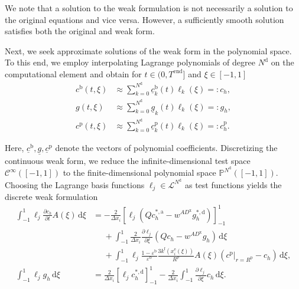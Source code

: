 We note that a solution to the weak formulation is not necessarily a solution to the original equations and vice versa. However, a sufficiently smooth solution satisfies both the original and weak form.

Next, we seek approximate solutions of the weak form in the polynomial space. To this end, we employ interpolating Lagrange polynomials of degree $N^\mathrm{d}$ on the computational element and obtain for $t\in(0,T^\mathrm{end}]$ and $\xi\in[-1,1]$
\begin{subequations}
\begin{align}
    c^\mathrm{b}(t,\xi)
    &\approx
    \sum_{k=0}^{N^\mathrm d}
    \underline{c}^\mathrm b_k(t)
    \ell_k(\xi)
    =:c_h,
    \\
    g(t,\xi)
    &\approx
    \sum_{k=0}^{N^\mathrm d}
    \underline{g}_k(t)
    \ell_k(\xi)
    =:g_h,
    \\
    c^\mathrm p(t,\xi)
    &\approx
    \sum_{k=0}^{N^\mathrm d}
    \underline{c}^\mathrm p_k(t)
    \ell_k(\xi)
    =:c_h^\mathrm p.
\end{align}
\end{subequations}

Here, $\underline{c}^\mathrm{b},\underline{g},\underline{c}^\mathrm{p}$ denote the vectors of polynomial coefficients.
Discretizing the continuous weak form, we reduce the infinite-dimensional test space $\mathcal C^\infty([-1,1])$ to the finite-dimensional polynomial space $\mathbb P^{N^\mathrm d}([-1,1])$.
Choosing the Lagrange basis functions $\ell_j\in\mathcal L^{N^\mathrm d}$ as test functions yields the discrete weak formulation
\begin{align*}
    \int_{-1}^1
    \ell_j
    \frac{\partial c_h}{\partial t}
    A(\xi)
    \,\mathrm d\xi
    &=
    -\frac{2}{\Delta x_i}
    \left[
    \ell_j
    \left(
    Qc_h^{*,\mathrm a}
    -
    w^{AD^\mathrm{x}} g_h^{*,\mathrm d}
    \right)
    \right]_{-1}^{1}
    \\
    &\phantom{={}}
    +
    \int_{-1}^1
    \frac{2}{\Delta x_i}
    \frac{\partial\ell_j}{\partial\xi}
    \left(
    Qc_h
    -
    w^{AD^\mathrm{x}} g_h
    \right)
    \,\mathrm d\xi
    \\
    &\phantom{={}}
    +
    \int_{-1}^1
    \ell_j
    \frac{1-\varepsilon^\mathrm b}{\varepsilon^\mathrm b}
    \frac{3k^\mathrm f(x_i^\mathrm e(\xi))}{R^\mathrm p}
    A(\xi)
    \left(
    \left.c^\mathrm p\right|_{r=R^\mathrm p}
    -
    c_h
    \right)
    \,\mathrm d\xi,
    \\
    \int_{-1}^1
    \ell_j g_h
    \,\mathrm d\xi
    &=
    \frac{2}{\Delta x_i}
    \left[
    \ell_j
    c_h^{*,\mathrm d}
    \right]_{-1}^{1}
    -
    \frac{2}{\Delta x_i}
    \int_{-1}^1
    \frac{\partial\ell_j}{\partial\xi}
    c_h
    \,\mathrm d\xi.
\end{align*}


